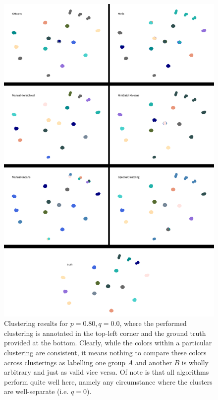\documentclass{article}
\begin{document}
\begin{figure}[H]
    \label{fig:results_p-80_q-00}
    \centering
    \includegraphics[width=.85\textwidth]{results/results_p-80_q-00.png}
    \caption[Clustering for $p=0.80,q=0.0$]{Clustering results for $p=0.80,q=0.0$, where the performed clustering is annotated in the top-left corner and the ground truth provided at the bottom. Clearly, while the colors within a particular clustering are consistent, it means nothing to compare these colors across clusterings as labelling one group $A$ and another $B$ is wholly arbitrary and just as valid vice versa. Of note is that all algorithms perform quite well here, namely any circumstance where the clusters are well-separate (i.e. $q=0$).}
\end{figure}
\end{document}
